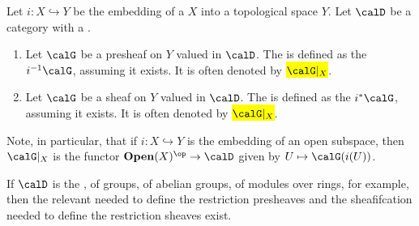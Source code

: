 \begin{definition} \label{definition:restriction_of_a_presheaf_sheaf_on_a_topological_space}
    Let $i: X \hookrightarrow Y$ be the embedding of a  $X$ into a topological space $Y$. Let $\calD$ be a category with a .

    \begin{enumerate}
        \item Let $\calG$ be a presheaf on $Y$ valued in $\calD$. The  is defined as the  $i^{-1} \calG$, assuming it exists. It is often denoted by \hl{$\calG|_X$}. 

        \item Let $\calG$ be a sheaf on $Y$ valued in $\calD$. The  is defined as the  $i^{*} \calG$, assuming it exists. It is often denoted by \hl{$\calG|_X$}. 
    \end{enumerate}

    Note, in particular, that if $i: X \hookrightarrow Y$ is the embedding of an open subspace, then $\calG|_X$ is the functor $\mathbf{Open}(X)^{\op} \to \calD$ given by $U \mapsto \calG(i(U))$. 

    If $\calD$ is the , of groups, of abelian groups, of modules over rings, for example, then the relevant  needed to define the restriction presheaves and the sheafifcation needed to define the restriction sheaves exist.



\end{definition}